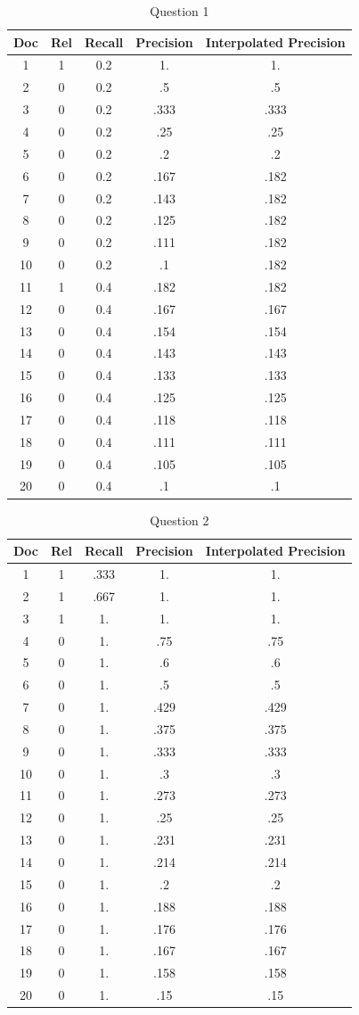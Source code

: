 \documentclass[letterpaper,12pt]{article}
\begin{document}
\pagebreak

\begin{table}[h]
\centering
\begin{tabular}{ |c|c|c|c|c| } 
 \hline
 Doc & Rel & Recall & Precision & Interpolated Precision\\ 
\hline
1&1&0.2&1.&1. \\
2&0&0.2&.5&.5\\
3&0&0.2&.333&.333\\
4&0&0.2&.25&.25\\
5&0&0.2&.2&.2\\
6&0&0.2&.167&.182\\
7&0&0.2&.143&.182\\
8&0&0.2&.125&.182\\
9&0&0.2&.111&.182\\
10&0&0.2&.1&.182\\
11&1&0.4&.182&.182\\
12&0&0.4&.167&.167\\
13&0&0.4&.154&.154\\
14&0&0.4&.143&.143\\
15&0&0.4&.133&.133\\
16&0&0.4&.125&.125\\
17&0&0.4&.118&.118\\
18&0&0.4&.111&.111\\
19&0&0.4&.105&.105\\
20&0&0.4&.1&.1\\
 \hline
\end{tabular}
\caption{Question 1}
\end{table}

\begin{table}[h]
\centering
\begin{tabular}{ |c|c|c|c|c| } 
 \hline
 Doc & Rel & Recall & Precision & Interpolated Precision\\ 
\hline
1&1&.333&1.&1.\\
2&1&.667&1.&1.\\
3&1&1.&1.&1.\\
4&0&1.&.75&.75\\
5&0&1.&.6&.6\\
6&0&1.&.5&.5\\
7&0&1.&.429&.429\\
8&0&1.&.375&.375\\
9&0&1.&.333&.333\\
10&0&1.&.3&.3\\
11&0&1.&.273&.273\\
12&0&1.&.25&.25\\
13&0&1.&.231&.231\\
14&0&1.&.214&.214\\
15&0&1.&.2&.2\\
16&0&1.&.188&.188\\
17&0&1.&.176&.176\\
18&0&1.&.167&.167\\
19&0&1.&.158&.158\\
20&0&1.&.15&.15\\
 \hline
\end{tabular}
\caption{Question 2}
\end{table}
\end{document}
